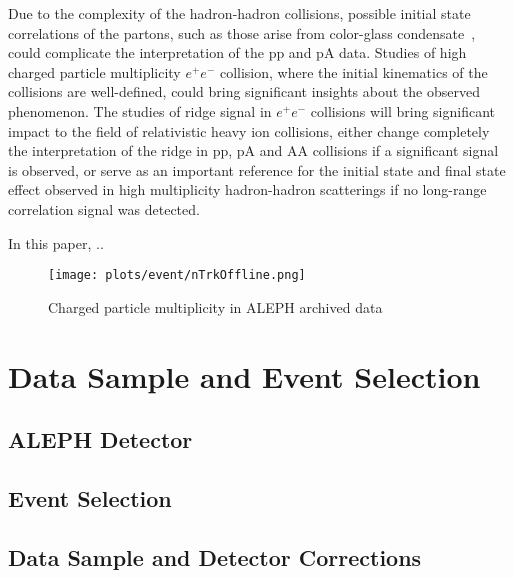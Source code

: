 \documentclass[aps,prl,twocolumn,showpacs,superscriptaddress,groupedaddress]{revtex4}  %
\begin{document}
Due to the complexity of the hadron-hadron collisions, possible initial state correlations of the partons, such as those arise from color-glass condensate~\cite{Gelis:2010nm, Dusling:2013qoz}, could complicate the interpretation of the pp and pA data. Studies of high charged particle multiplicity $e^+e^-$ collision, where the initial kinematics of the collisions are well-defined, could bring significant insights about the observed phenomenon. 
The studies of ridge signal in $e^+e^-$ collisions will bring significant impact to the field of relativistic heavy ion collisions, either change completely the interpretation of the ridge in pp, pA and AA collisions if a significant signal is observed, or serve as an important reference for the initial state and final state effect observed in high multiplicity hadron-hadron scatterings if no long-range correlation signal was detected. 

In this paper, ..


\begin{figure}[!htb]
\begin{center}
\texttt{[image: plots/event/nTrkOffline.png]}
\caption{Charged particle multiplicity in ALEPH archived data}
\label{fig:figure1} 
\end{center}
\end{figure}


\section{\label{sec:datasample}Data Sample and Event Selection}

\subsection{\label{sec:}ALEPH Detector}
\subsection{\label{sec:}Event Selection}
\subsection{\label{sec:}Data Sample and Detector Corrections}

\end{document}
